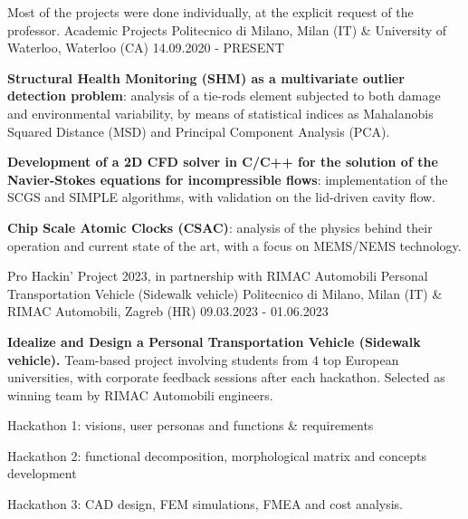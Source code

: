 

\begin{cventries}

    \cventry
    {Most of the projects were done individually, at the explicit request of the professor.}
    {Academic Projects}
    {Politecnico di Milano, Milan (IT) \& University of Waterloo, Waterloo (CA)}
    {14.09.2020 - PRESENT}
    {
        \begin{cvitems}
            \item {\textbf{Structural Health Monitoring (SHM) as a multivariate outlier detection problem}: analysis of a tie-rods element subjected to both damage and environmental variability, by means of statistical indices as Mahalanobis Squared Distance (MSD) and Principal Component Analysis (PCA).}
            \item {\textbf{Development of a 2D CFD solver in C/C++ for the solution of the Navier-Stokes equations for incompressible flows}: implementation of the SCGS and SIMPLE algorithms, with validation on the lid-driven cavity flow.}
            \item {\textbf{Chip Scale Atomic Clocks (CSAC)}: analysis of the physics behind their operation and current state of the art, with a focus on MEMS/NEMS technology.}
        \end{cvitems}
    }

    \cventry
    {Pro Hackin' Project 2023, in partnership with RIMAC Automobili}
    {Personal Transportation Vehicle (Sidewalk vehicle)}
    {Politecnico di Milano, Milan (IT) \& RIMAC Automobili, Zagreb (HR)}
    {09.03.2023 - 01.06.2023}
    {
        \textbf{Idealize and Design a Personal Transportation Vehicle (Sidewalk vehicle).}
        \newline
        \vspace{2mm}
        Team-based project involving students from 4 top European universities, with corporate feedback sessions after each hackathon.
        Selected as winning team by RIMAC Automobili engineers.
        \newline
        \vspace{4mm}
        \begin{cvitems}
            \item {Hackathon 1: visions, user personas and functions \& requirements}
            \item {Hackathon 2: functional decomposition, morphological matrix and concepts development}
            \item {Hackathon 3: CAD design, FEM simulations, FMEA and cost analysis.}
        \end{cvitems}
    }


\end{cventries}
